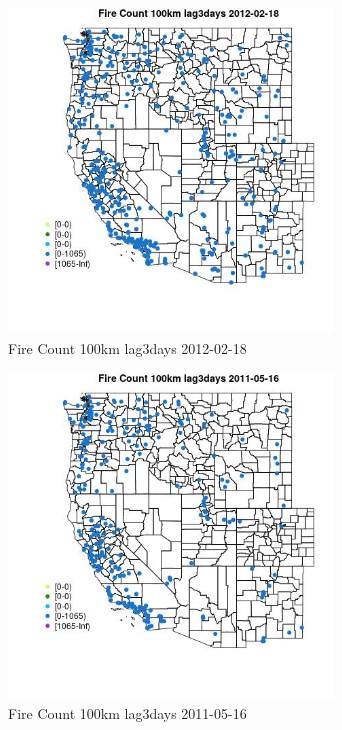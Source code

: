 \begin{figure} 
\centering  
\includegraphics[width=0.77\textwidth]{Code_Outputs/Report_ML_input_PM25_Step4_part_f_de_duplicated_aves_prioritize_24hr_obswNAs_MapObsFire_Count_100km_lag3days2012-02-18.jpg} 
\caption{\label{fig:Report_ML_input_PM25_Step4_part_f_de_duplicated_aves_prioritize_24hr_obswNAsMapObsFire_Count_100km_lag3days2012-02-18}Fire Count 100km lag3days 2012-02-18} 
\end{figure} 
 

\begin{figure} 
\centering  
\includegraphics[width=0.77\textwidth]{Code_Outputs/Report_ML_input_PM25_Step4_part_f_de_duplicated_aves_prioritize_24hr_obswNAs_MapObsFire_Count_100km_lag3days2011-05-16.jpg} 
\caption{\label{fig:Report_ML_input_PM25_Step4_part_f_de_duplicated_aves_prioritize_24hr_obswNAsMapObsFire_Count_100km_lag3days2011-05-16}Fire Count 100km lag3days 2011-05-16} 
\end{figure} 
 

